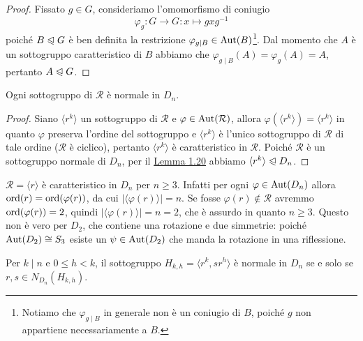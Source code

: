 \documentclass[11pt]{scrartcl}
\begin{document}
\begin{proof}
    Fissato $g \in G$, consideriamo l'omomorfismo di coniugio 
    \[
        \varphi_g : G\longrightarrow G : x\longmapsto gxg^{-1}
    \] poiché 
    $B\trianglelefteqslant G$ è ben definita la restrizione $\varphi_{g\mid B} \in \operatorname{Aut}(B)$\footnote{
        Notiamo che $\varphi_{g\mid B}$ in generale non è un 
        coniugio di $B$, poiché $g$ non appartiene necessariamente a $B$.
    }. 
    Dal momento che $A$ è
    un sottogruppo caratteristico di $B$ abbiamo che $\varphi_{g\mid B}(A) =
    \varphi_g(A) = A$,
    pertanto $A \trianglelefteqslant G$.
\end{proof}


\begin{corollary}
    Ogni sottogruppo di $\mathcal{R}$ è normale in $D_n$.
\end{corollary}

\begin{proof}
    Siano $\langle r^k\rangle$ un sottogruppo di $\mathcal{R}$ e $\varphi
    \in \operatorname{Aut}(\mathcal{R})$, allora $\varphi(\langle r^k\rangle) = \langle r^k\rangle$
    in quanto $\varphi$ preserva l'ordine del sottogruppo e $\langle r^k\rangle$
    è l'unico sottogruppo di $\mathcal{R}$ di tale ordine ($\mathcal{R}$ è ciclico),
    pertanto $\langle r^k\rangle$
    è caratteristico in $\mathcal{R}$. Poiché $\mathcal{R}$ è un sottogruppo
    normale di $D_n$, per il \hyperref[lemma1.20]{Lemma 1.20}
    abbiamo $\langle r^k\rangle\trianglelefteqslant D_n$.
\end{proof}

\begin{remark}
    $\mathcal{R} = \langle r \rangle$ è caratteristico in $D_n$ per $n \geqslant 3$.
    Infatti per ogni $\varphi \in \operatorname{Aut}(D_n)$ allora
    $\operatorname{ord}(r) = \operatorname{ord}(\varphi(r))$, da cui $|\langle\varphi(r)\rangle| = n$.
    Se fosse $\varphi(r) \notin \mathcal{R}$ avremmo $\operatorname{ord}(\varphi(r)) = 2$, 
    quindi $|\langle \varphi(r)\rangle| = n = 2$, che è assurdo in quanto $n \geqslant 3$.
    Questo non è vero per $D_2$, che contiene una rotazione e due
    simmetrie: poiché $\operatorname{Aut}(D_2) \cong S_3$ esiste un $\psi \in \operatorname{Aut}(D_2)$ che manda 
    la rotazione in una riflessione.
\end{remark}

\begin{corollary}
    Per $k\mid n$ e $0\leq h < k$, il sottogruppo $H_{k, h} = \langle r^k, sr^h\rangle$
    è normale in $D_n$ se e solo se $r, s \in N_{D_n}(H_{k, h})$.
\end{corollary}
\end{document}
